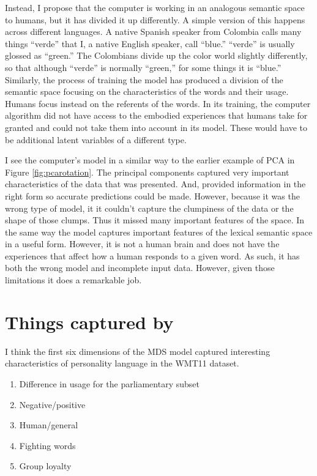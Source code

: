 Instead, I propose that the computer is working in an analogous semantic space 
to humans, but it has divided it up differently. A simple version of this 
happens across different languages. A native Spanish speaker from Colombia calls 
many things ``verde'' that I, a native English speaker, call ``blue.'' ``verde'' 
is usually glossed as ``green.'' The Colombians divide up the color world 
slightly differently, so that although ``verde'' is normally ``green,'' for some 
things it is ``blue.'' Similarly, the process of training the \modelname{} model 
has produced a division of the semantic space focusing on the characteristics of 
the words and their usage. Humans focus instead on the referents of the words. 
In its training, the computer algorithm did not have access to the embodied 
experiences that humans take for granted and could not take them into account in 
its model. These would have to be additional latent variables of a different 
type.

I see the computer's model in a similar way to the earlier example of PCA in 
Figure \ref{fig:pcarotation}. The principal components captured very important
characteristics of the data that was presented. And, provided information in 
the right 
form so accurate predictions could be made. However, because it was the wrong
type of model, it it couldn't capture the clumpiness of the data or the 
shape of those clumps. Thus it missed many important features of the space. In 
the same way
the \modelname{} model captures important features of the lexical semantic space
in a useful form. However, it is not a human brain and does not have the 
experiences that affect how a human responds to a given word. As such, it has
both the wrong model and incomplete input data. However, given those limitations
it does a remarkable job.

\section{Things captured by \modelname{}}

I think the first six dimensions of the MDS \modelname{} model captured
 interesting characteristics of personality language in the WMT11 dataset.
%
\begin{enumerate}
 \item Difference in usage for the parliamentary subset
 \item Negative/positive
 \item Human/general
 \item Fighting words
 \item Group loyalty
\end{enumerate}

